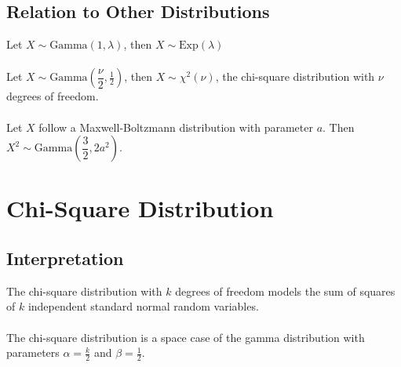 \documentclass[1pt]{report}
\newcommand{\<}{\langle}
\renewcommand{\>}{\rangle}
\newcommand{\gam}{\text{Gamma}}
\newcommand{\Exp}{\text{Exp}}
\begin{document}
\subsection{Relation to Other Distributions}
Let $X \sim \gam(1, \lambda)$, then $X\sim \Exp(\lambda)$\\
\\
Let $X \sim \gam\left(\dfrac{\nu}{2}, \frac{1}{2}\right)$, then $X \sim \chi^2(\nu)$, the chi-square distribution with $\nu$ degrees of freedom.\\
\\
Let $X$ follow a Maxwell-Boltzmann distribution with parameter $a$. Then $X^2 \sim \gam\left(\dfrac{3}{2}, 2a^2\right)$.

\newpage
\section{Chi-Square Distribution}
\subsection{Interpretation}
The chi-square distribution with $k$ degrees of freedom models the sum of squares of $k$ independent standard normal random variables.\\
\\
The chi-square distribution is a space case of the gamma distribution with parameters $\alpha = \frac{k}{2}$ and $\beta = \frac{1}{2}$.
\end{document}
